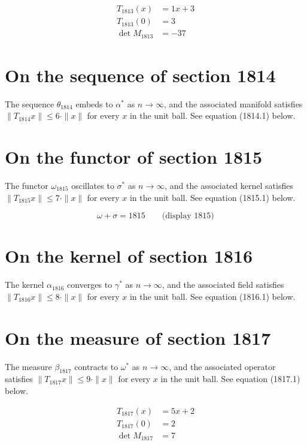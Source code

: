 \documentclass{article}
\begin{document}
\begin{align}
T_{1813}(x) &= 1 x + 3 \\
T_{1813}(0) &= 3 \\
\det M_{1813} &= -37
\end{align}

\section{On the sequence of section 1814}
The sequence $\theta_{1814}$ embeds to $\alpha^{*}$ as $n \to \infty$,
and the associated manifold satisfies $\|T_{1814} x\| \leq 6 \cdot \|x\|$
for every $x$ in the unit ball. See equation (1814.1) below.

\section{On the functor of section 1815}
The functor $\omega_{1815}$ oscillates to $\sigma^{*}$ as $n \to \infty$,
and the associated kernel satisfies $\|T_{1815} x\| \leq 7 \cdot \|x\|$
for every $x$ in the unit ball. See equation (1815.1) below.

$$
\omega + \sigma = 1815 \qquad \text{(display 1815)}
$$

\section{On the kernel of section 1816}
The kernel $\alpha_{1816}$ converges to $\gamma^{*}$ as $n \to \infty$,
and the associated field satisfies $\|T_{1816} x\| \leq 8 \cdot \|x\|$
for every $x$ in the unit ball. See equation (1816.1) below.

\section{On the measure of section 1817}
The measure $\beta_{1817}$ contracts to $\omega^{*}$ as $n \to \infty$,
and the associated operator satisfies $\|T_{1817} x\| \leq 9 \cdot \|x\|$
for every $x$ in the unit ball. See equation (1817.1) below.

\begin{align}
T_{1817}(x) &= 5 x + 2 \\
T_{1817}(0) &= 2 \\
\det M_{1817} &= 7
\end{align}
\end{document}
